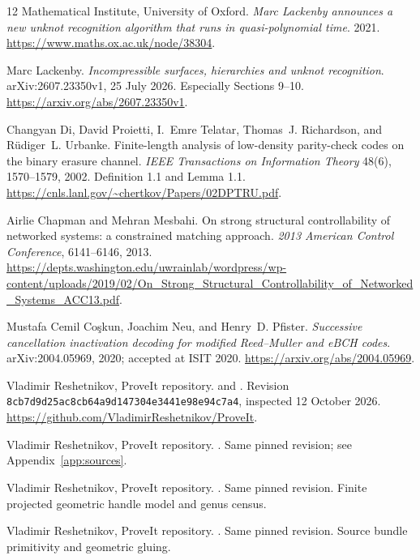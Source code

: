 \documentclass[11pt]{article}
\theoremstyle{definition}\newtheorem{definition}[theorem]{Definition}
\theoremstyle{remark}\newtheorem{remark}[theorem]{Remark}
\newcommand{\pin}{\texttt{8cb7d9d25ac8cb64a9d147304e3441e98e94c7a4}}
\begin{document}
\begin{thebibliography}{12}
\small\setlength{\itemsep}{2pt}\setlength{\parskip}{0pt}
Mathematical Institute, University of Oxford.
\emph{Marc Lackenby announces a new unknot recognition algorithm that runs in quasi-polynomial time}. 2021.
\url{https://www.maths.ox.ac.uk/node/38304}.

Marc Lackenby.
\emph{Incompressible surfaces, hierarchies and unknot recognition}.
arXiv:2607.23350v1, 25 July 2026. Especially Sections 9--10.
\url{https://arxiv.org/abs/2607.23350v1}.

Changyan Di, David Proietti, I.~Emre Telatar, Thomas~J. Richardson, and R\"udiger~L. Urbanke.
Finite-length analysis of low-density parity-check codes on the binary erasure channel.
\emph{IEEE Transactions on Information Theory} 48(6), 1570--1579, 2002.
Definition 1.1 and Lemma 1.1.
\url{https://cnls.lanl.gov/~chertkov/Papers/02DPTRU.pdf}.

Airlie Chapman and Mehran Mesbahi.
On strong structural controllability of networked systems: a constrained matching approach.
\emph{2013 American Control Conference}, 6141--6146, 2013.
\url{https://depts.washington.edu/uwrainlab/wordpress/wp-content/uploads/2019/02/On_Strong_Structural_Controllability_of_Networked_Systems_ACC13.pdf}.

Mustafa Cemil Co\c{s}kun, Joachim Neu, and Henry~D. Pfister.
\emph{Successive cancellation inactivation decoding for modified Reed--Muller and eBCH codes}.
arXiv:2004.05969, 2020; accepted at ISIT 2020.
\url{https://arxiv.org/abs/2004.05969}.

Vladimir Reshetnikov, ProveIt repository.
 and
.
Revision \pin, inspected 12 October 2026.
\url{https://github.com/VladimirReshetnikov/ProveIt}.

Vladimir Reshetnikov, ProveIt repository.
.
Same pinned revision; see Appendix~\ref{app:sources}.

Vladimir Reshetnikov, ProveIt repository.
.
Same pinned revision. Finite projected geometric handle model and genus census.

Vladimir Reshetnikov, ProveIt repository.
.
Same pinned revision. Source bundle primitivity and geometric gluing.
\end{thebibliography}
\end{document}
